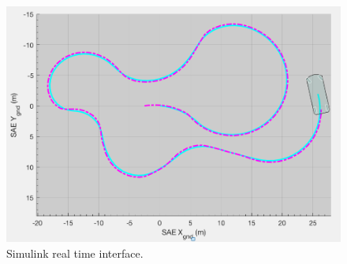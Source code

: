 \begin{figure}[htb]
    \centering
    \includegraphics[scale=0.5]{images/2danimation.png}
    \caption{Simulink real time interface.}
	\label{animfig}
\end{figure}

